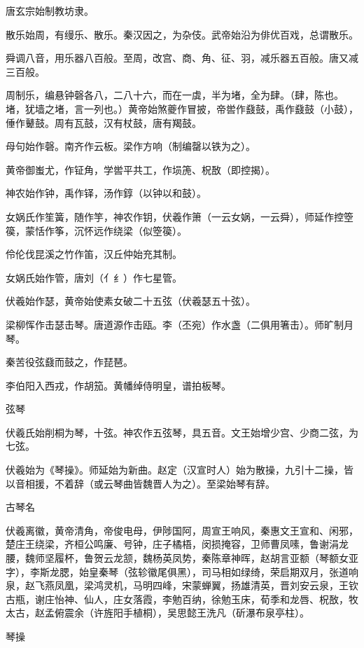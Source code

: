 \documentclass[a4paper,12pt,UTF8,twoside]{ctexbook}
\begin{document}
    唐玄宗始制教坊隶。
    
    散乐始周，有缦乐、散乐。秦汉因之，为杂伎。武帝始沿为俳优百戏，总谓散乐。
    
    舜调八音，用乐器八百般。至周，改宫、商、角、征、羽，减乐器五百般。唐又减三百般。
    
    周制乐，编悬钟磬各八，二八十六，而在一虡，半为堵，全为肆。（肆，陈也。堵，犹墙之堵，言一列也。）黄帝始煞夔作冒披，帝喾作鼗鼓，禹作鼗鼓（小鼓），倕作鼙鼓。周有瓦鼓，汉有杖鼓，唐有羯鼓。
    
    母句始作磬。南齐作云板。梁作方响（制编罄以铁为之）。
    
    黄帝御蚩尤，作钲角，学喾平共工，作埙箎、柷敔（即控揭）。
    
    神农始作钟，禹作铎，汤作錞（以钟以和鼓）。
    
    女娲氏作笙簧，随作竽，神农作钥，伏羲作箫（一云女娲，一云舜），师延作控箜篌，蒙恬作筝，沉怀远作绕梁（似箜篌）。
    
    伶伦伐昆溪之竹作笛，汉丘仲始充其制。
    
    女娲氏始作管，唐刘（亻纟）作七星管。
    
    伏羲始作瑟，黄帝始使素女破二十五弦（伏羲瑟五十弦）。
    
    梁柳恽作击瑟击琴。唐道源作击瓯。李（丕宛）作水盏（二俱用箸击）。师旷制月琴。
    
    秦苦役弦鼗而鼓之，作琵琶。
    
    李伯阳入西戎，作胡笳。黄幡绰侍明皇，谱拍板琴。
    
    弦琴
    
    伏羲氏始削桐为琴，十弦。神农作五弦琴，具五音。文王始增少宫、少商二弦，为七弦。
    
    伏羲始为《琴操》。师延始为新曲。赵定（汉宣时人）始为散操，九引十二操，皆以音相援，不着辞（或云琴曲皆魏晋人为之）。至梁始琴有辞。
    
    古琴名
    
    伏羲离徽，黄帝清角，帝俊电母，伊陟国阿，周宣王响风，秦惠文王宣和、闲邪，楚庄王绕梁，齐桓公鸣廉、号钟，庄子橘梧，闵损掩容，卫师曹凤嗉，鲁谢涓龙腰，魏师坚履杯，鲁贺云龙颔，魏杨英凤势，秦陈章神晖，赵胡言亚额（琴额女亚字），李斯龙腮，始皇秦琴（弦轸徽尾俱黑），司马相如绿绮，荣启期双月，张道响泉，赵飞燕凤凰，梁鸿灵机，马明四峰，宋蒙蝉翼，扬雄清英，晋刘安云泉，王钦古瓶，谢庄怡神、仙人，庄女落霞，李勉百纳，徐勉玉床，荀季和龙唇、柷敔，牧太古，赵孟俯震余（许旌阳手植桐），吴思懿王洗凡（斫瀑布泉亭柱）。
    
    琴操
    
\end{document}
